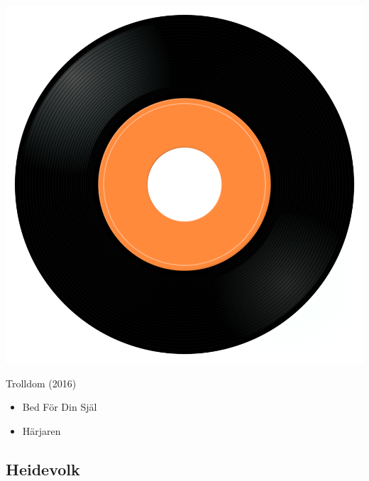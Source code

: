 \begin{minipage}[t]{0.25\textwidth}
\captionsetup{type=figure}
\includegraphics[width=\textwidth]{Images/cover.png}
\caption*{Trolldom (2016)}
\end{minipage}
\begin{minipage}[t]{0.25\textwidth}\vspace{0pt}
\begin{itemize}[nosep,leftmargin=1em,labelwidth=*,align=left]
	\setlength{\itemsep}{0pt}
	\item Bed För Din Själ
	\item Härjaren
\end{itemize}
\end{minipage}

\subsection{Heidevolk}

